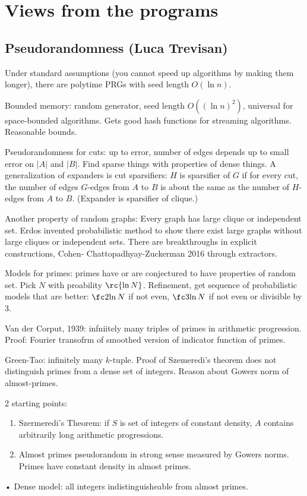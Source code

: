 \section{Views from the programs}

\subsection{Pseudorandomness (Luca Trevisan)}

Under standard assumptions (you cannot speed up algorithms by making them longer), 
there are polytime PRGs with seed length $O(\ln n)$.

Bounded memory: random generator, seed length $O((\ln n)^2)$, universal for space-bounded algorithms. Gets good hash functions for streaming algorithms. Reasonable bounds.

Pseudorandomness for cuts: up to error, number of edges depends up to small error on $|A|$ and $|B|$.
Find sparse things with properties of dense things. A generalization of expanders is cut sparsifiers: $H$ is sparsifier of $G$ if for every cut, the number of edges $G$-edges from $A$ to $B$ is about the same as the number of $H$-edges from $A$ to $B$. (Expander is sparsifier of clique.)

Another property of random graphs: Every graph has large clique or independent set. Erdos invented probabilistic method to show there exist large graphs without large cliques or independent sets. There are breakthroughs in explicit constructions, Cohen- Chattopadhyay-Zuckerman 2016 through extractors.

Models for primes: primes have or are conjectured to have properties of random set. Pick $N$ with proability $\rc{\ln N}$. Refinement, get sequence of probabilistic models that are better: $\fc 2{\ln N}$ if not even, $\fc 3{\ln N}$ if not even or divisible by 3. 

Van der Corput, 1939: infniitely many triples of primes in arithmetic progression. Proof: Fourier transofrm of smoothed version of indicator function of primes.

Green-Tao: infinitely many $k$-tuple. Proof of Szemeredi's theorem does not distinguish primes from a dense set of integers. Reason about Gowers norm of almost-primes. 

2 starting points:
\begin{enumerate}
\item
Szermeredi's Theorem: if $S$ is set of integers of constant density, $A$ contains arbitrarily long arithmetic progressions.
\item
Almost primes pseudorandom in strong sense measured by Gowers norms. Primes have constant density in almost primes.
\end{enumerate}•
Dense model: all integers indistinguisheable from almost primes.

